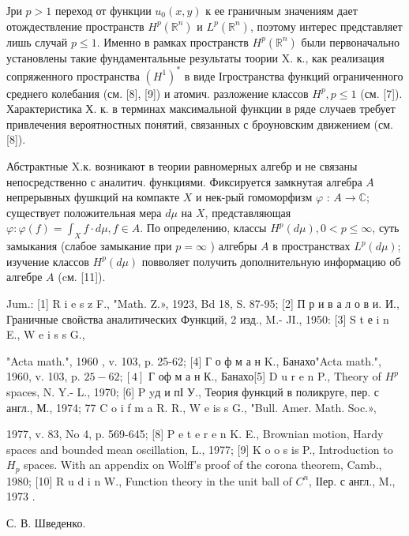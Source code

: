 \documentclass[10pt]{article}
\begin{document}
Јри $p>1$ переход от функции $u_{0}(x, y)$ к ее граничным значениям дает отождествление пространств $H^{p}\left(\mathbb{R}^{n}\right)$ и $L^{p}\left(\mathbb{R}^{n}\right)$, поэтому интерес представляет лишь случай $p \leqslant 1$. Именно в рамках пространств $H^{p}\left(\mathbb{R}^{n}\right)$ были первоначально установлены такие фундаментальные результаты тоории X. к., как реализация сопряженного пространства $\left(H^{1}\right)^{*}$ в виде Ігространства функций ограниченного среднего колебания (см. [8], [9]) и атомич. разложение классов $H^{p}, p \leqslant 1$ (см. [7]). Характеристика Х. к. в терминах максимальной функции в ряде случаев требует привлечения вероятностных понятий, связанных с броуновским движением (см. [8]).



Абстрактные X.к. возникают в теории равномерных алгебр и не связаны непосредственно с аналитич. функциями. Фиксируется замкнутая алгебра $A$ непрерывных фушкций на компакте $X$ и нек-рый гомоморфизм $\varphi$ : $A \longrightarrow \mathbb{C} ;$ существует положительная мера $d \mu$ на $X$, представляющая $\varphi: \varphi(f)=\int_{X} f \cdot d \mu, f \in A$. По определению, классы $H^{p}(d \mu), 0<p \leqslant \infty$, суть замыкания (слабое замыкание при $p=\infty$ ) алгебры $A$ в пространствах $L^{p}(d \mu)$; изучение классов $H^{p}(d \mu)$ повволяет получить дополнительную информацию об алгебре $A$ (cм. [11]).



Jum.: [1] R i e s z F., "Math. Z.», 1923, Bd 18, S. 87-95; [2] П р и в а л о в и. И., Граничные свойства аналитических Функций, 2 изд., M.- JI., 1950: [3] S t е i n E., W e i s s G.,

"Acta math.", 1960 , v. 103, p. 25-62; [4] Г о ф м а н K., Банахо"Acta math.", 1960, v. 103, p. $25-62 ;[4]$ Г оф м а н К., Банахо[5] D u r e n P., Theory of $H^{p}$ spaces, N. Y.- L., 1970; [6] P yд и пІ У., Теория функций в поликруге, пер. с англ., М., 1974; 77 C o i f m a R. R., W e is s G., "Bull. Amer. Math. Soc.»,

1977, v. 83, No 4, p. 569-645; [8] P e t e r e n K. E., Brownian motion, Hardy spaces and bounded mean oscillation, L., 1977; [9] K o o s is P., Introduction to $H_{p}$ spaces. With an appendix on Wolff's proof of the corona theorem, Camb., 1980; [10] R u d i n W., Function theory in the unit ball of $C^{n}$, ІІер. с англ., M., 1973 .



С. В. Шведенко.
\end{document}
